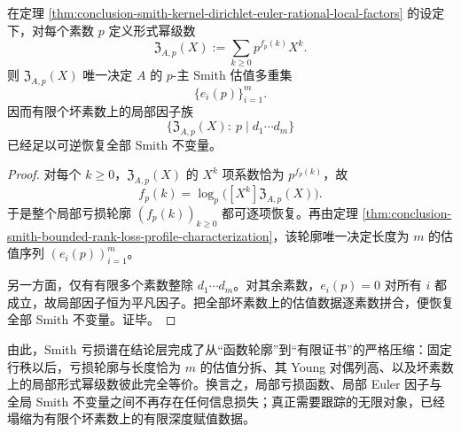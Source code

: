 \begin{corollary}\label{cor:conclusion-smith-local-zeta-complete-invariant}
在定理 \ref{thm:conclusion-smith-kernel-dirichlet-euler-rational-local-factors} 的设定下，对每个素数 \(p\) 定义形式幂级数
\[
\mathfrak Z_{A,p}(X):=\sum_{k\ge 0}p^{f_p(k)}X^k.
\]
则 \(\mathfrak Z_{A,p}(X)\) 唯一决定 \(A\) 的 \(p\)-主 Smith 估值多重集
\[
\{e_i(p)\}_{i=1}^{m}.
\]
因而有限个坏素数上的局部因子族
\[
\{\mathfrak Z_{A,p}(X):\ p\mid d_1\cdots d_m\}
\]
已经足以可逆恢复全部 Smith 不变量。
\end{corollary}
\begin{proof}
对每个 \(k\ge 0\)，\(\mathfrak Z_{A,p}(X)\) 的 \(X^k\) 项系数恰为 \(p^{f_p(k)}\)，故
\[
f_p(k)=\log_p\!\bigl([X^k]\mathfrak Z_{A,p}(X)\bigr).
\]
于是整个局部亏损轮廓 \((f_p(k))_{k\ge 0}\) 都可逐项恢复。再由定理 \ref{thm:conclusion-smith-bounded-rank-loss-profile-characterization}，该轮廓唯一决定长度为 \(m\) 的估值序列 \((e_i(p))_{i=1}^{m}\)。

另一方面，仅有有限多个素数整除 \(d_1\cdots d_m\)。对其余素数，\(e_i(p)=0\) 对所有 \(i\) 都成立，故局部因子恒为平凡因子。把全部坏素数上的估值数据逐素数拼合，便恢复全部 Smith 不变量。证毕。
\end{proof}

\noindent
由此，Smith 亏损谱在结论层完成了从“函数轮廓”到“有限证书”的严格压缩：固定行秩以后，亏损轮廓与长度恰为 \(m\) 的估值分拆、其 Young 对偶列高、以及坏素数上的局部形式幂级数彼此完全等价。换言之，局部亏损函数、局部 Euler 因子与全局 Smith 不变量之间不再存在任何信息损失；真正需要跟踪的无限对象，已经塌缩为有限个坏素数上的有限深度赋值数据。

\endinput

